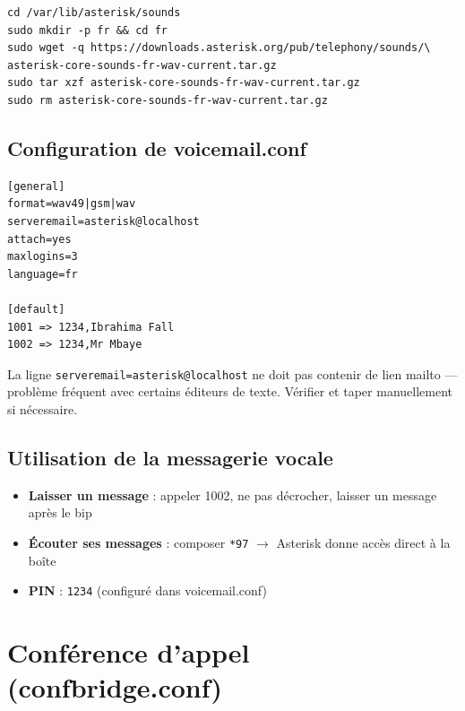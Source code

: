 \documentclass[a4paper,11pt]{report}
\begin{document}
\begin{codebox}
\begin{lstlisting}
cd /var/lib/asterisk/sounds
sudo mkdir -p fr && cd fr
sudo wget -q https://downloads.asterisk.org/pub/telephony/sounds/\
asterisk-core-sounds-fr-wav-current.tar.gz
sudo tar xzf asterisk-core-sounds-fr-wav-current.tar.gz
sudo rm asterisk-core-sounds-fr-wav-current.tar.gz
\end{lstlisting}
\end{codebox}

\subsection{Configuration de voicemail.conf}

\begin{codebox}
\begin{lstlisting}
[general]
format=wav49|gsm|wav
serveremail=asterisk@localhost
attach=yes
maxlogins=3
language=fr

[default]
1001 => 1234,Ibrahima Fall
1002 => 1234,Mr Mbaye
\end{lstlisting}
\end{codebox}

\begin{warningbox}
La ligne \texttt{serveremail=asterisk@localhost} ne doit pas contenir de lien mailto — problème fréquent avec certains éditeurs de texte. Vérifier et taper manuellement si nécessaire.
\end{warningbox}

\subsection{Utilisation de la messagerie vocale}

\begin{itemize}[leftmargin=1.4em, itemsep=3pt]
  \item \textbf{Laisser un message} : appeler 1002, ne pas décrocher, laisser un message après le bip
  \item \textbf{Écouter ses messages} : composer \texttt{*97} $\to$ Asterisk donne accès direct à la boîte
  \item \textbf{PIN} : \texttt{1234} (configuré dans voicemail.conf)
\end{itemize}

\section{Conférence d'appel (confbridge.conf)}
\end{document}
